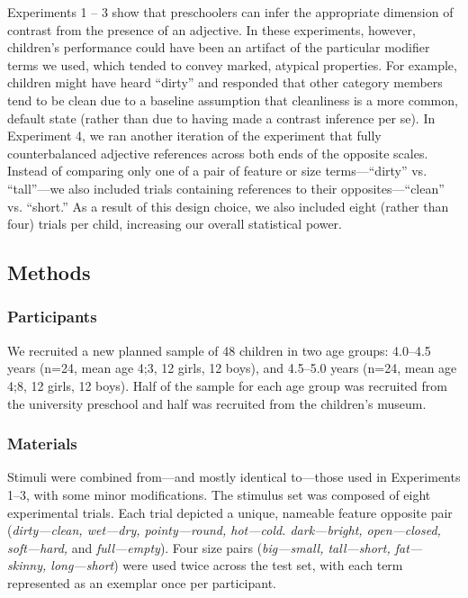 \documentclass[man]{apa2}
\begin{document}
Experiments 1 -- 3 show that preschoolers can infer the appropriate dimension of contrast from the presence of an adjective. In these experiments, however, children's performance could have been an artifact of the particular modifier terms we used, which tended to convey marked, atypical properties. For example, children might have heard ``dirty'' and responded that other category members tend to be clean due to a baseline assumption that cleanliness is a more common, default state (rather than due to having made a contrast inference per se). In Experiment 4, we ran another iteration of the experiment that fully counterbalanced adjective references across both ends of the opposite scales. Instead of comparing only one of a pair of feature or size terms---``dirty'' vs. ``tall''---we also included trials containing references to their opposites---``clean'' vs. ``short.''  As a result of this design choice, we also included eight (rather than four) trials per child, increasing our overall statistical power.

\subsection{Methods}

\subsubsection{Participants}

We recruited a new planned sample of 48 children in two age groups: 4.0--4.5 years (n=24, mean age 4;3, 12 girls, 12 boys), and 4.5--5.0 years (n=24, mean age 4;8, 12 girls, 12 boys).  Half of the sample for each age group was recruited from the university preschool and half was recruited from the children's museum.

\subsubsection{Materials}

Stimuli were combined from---and mostly identical to---those used in Experiments 1--3, with some minor modifications. The stimulus set was composed of eight experimental trials.  Each trial depicted a unique, nameable feature opposite pair (\emph{dirty---clean, wet---dry, pointy---round, hot---cold. dark---bright, open---closed, soft---hard,} and \emph{full---empty}). Four size pairs (\emph{big---small, tall---short, fat---skinny, long---short}) were used twice across the test set, with each term represented as an exemplar once per participant.  
\end{document}
